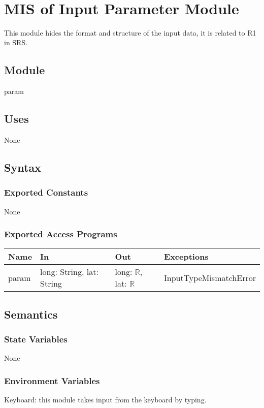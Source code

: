 \documentclass[12pt, titlepage]{article}
\begin{document}
~\newpage

\section{MIS of Input Parameter Module} \label{inputParameterModule} 
This module hides the format and structure of the input data, it is related to R1 in SRS.
\subsection{Module}
param
\subsection{Uses}
None

\subsection{Syntax}

\subsubsection{Exported Constants}
None

\subsubsection{Exported Access Programs}

\begin{center}
\begin{tabular}{p{2cm} p{4.5cm} p{3cm} p{4cm}}
\hline
\textbf{Name} & \textbf{In} & \textbf{Out} & \textbf{Exceptions} \\
\hline
param & long: String, lat: String & long: $\mathbb{R}$, lat: $\mathbb{R}$ & InputTypeMismatchError \\
\hline
\end{tabular}
\end{center}

\subsection{Semantics}

\subsubsection{State Variables}
None

\subsubsection{Environment Variables}
Keyboard: this module takes input from the keyboard by typing.
\end{document}

